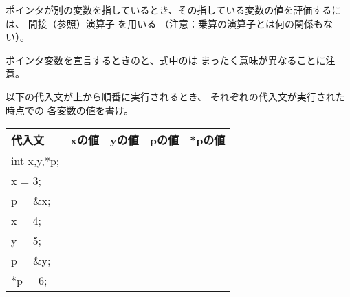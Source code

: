\documentclass[12pt,a4j]{jarticle}
\newcounter{toi}
\def\toi{%
\bigskip\bigskip\noindent
\addtocounter{toi}{1}
\shadowbox{\bfseries\large 問\thetoi}
\nopagebreak[4]\bigskip\nopagebreak[4]
}
\begin{document}
\toi

ポインタが別の変数を指しているとき、その指している変数の値を評価するには、
間接（参照）演算子 {\ttfamily *} を用いる
（注意：乗算の演算子とは何の関係もない）。


ポインタ変数を宣言するときの{\ttfamily *}と、式中の{\ttfamily *}は
まったく意味が異なることに注意。


以下の代入文が上から順番に実行されるとき、
それぞれの代入文が実行された時点での
各変数の値を書け。


\begin{center}\ttfamily
 \begin{tabular}{|l|c|c|c|c|}\hline
  代入文 & xの値 & yの値 & pの値 & *pの値\\ \hline\hline
  int x,y,*p; & & & & \\  \cline{2-5}
  x = 3; & & & & \\  \cline{2-5}
  p = \&x; & & & & \\  \cline{2-5}
  x = 4; & & & & \\  \cline{2-5}
  y = 5; & & & & \\  \cline{2-5}
  p = \&y;   & & & & \\  \cline{2-5}
  *p = 6;   & & & & \\  \hline
 \end{tabular}
\end{center}

\end{document}
